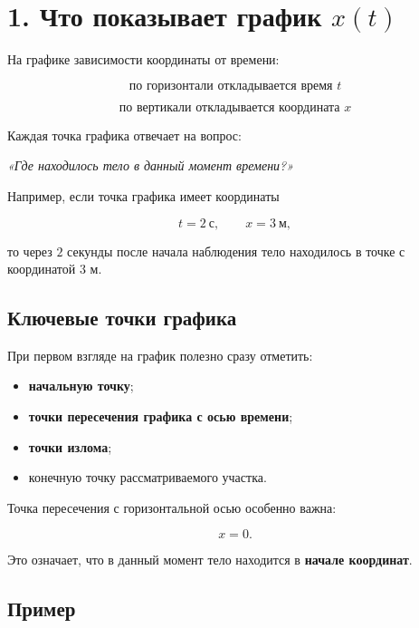 \documentclass[a4paper,12pt]{article}
\newcommand{\key}[1]{\textbf{\color{darkaccent}#1}}
\newcommand{\important}[1]{\textbf{\color{accent}#1}}
\begin{document}
\section{1. Что показывает график \(x(t)\)}

На графике зависимости координаты от времени:

\[
\boxed{\text{по горизонтали откладывается время }t}
\]

\[
\boxed{\text{по вертикали откладывается координата }x}
\]

Каждая точка графика отвечает на вопрос:

\begin{center}
\textit{«Где находилось тело в данный момент времени?»}
\end{center}

Например, если точка графика имеет координаты

\[
t=2~\text{с},
\qquad
x=3~\text{м},
\]

то через \(2\) секунды после начала наблюдения тело находилось в точке
с координатой \(3\) м.

\subsection{Ключевые точки графика}

При первом взгляде на график полезно сразу отметить:

\begin{itemize}
  \item \key{начальную точку};
  \item \key{точки пересечения графика с осью времени};
  \item \key{точки излома};
  \item конечную точку рассматриваемого участка.
\end{itemize}

Точка пересечения с горизонтальной осью особенно важна:

\[
x=0.
\]

Это означает, что в данный момент тело находится в \important{начале координат}.

\subsection{Пример}
\end{document}
